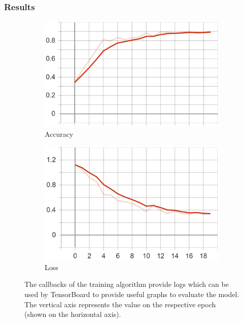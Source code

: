 \subsubsection{Results}
\begin{figure} \label{fig:first_model_graphs}
    \centering
    \begin{subfigure}[b]{0.4\textwidth}
        \includegraphics[width=\textwidth]{images/first_model_acc.png}
        \caption{Accuracy}
        \label{fig:first_model_acc}
    \end{subfigure}
    \begin{subfigure}[b]{0.4\textwidth}
        \includegraphics[width=\textwidth]{images/first_model_loss.png}
        \caption{Loss}
        \label{fig:first_model_loss}
    \end{subfigure}
    \caption{The callbacks of the training algorithm provide logs which can be used by TensorBoard to provide useful graphs to evaluate the model. The vertical axis represents the value on the respective epoch (shown on the horizontal axis).}
\end{figure}

